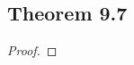 \documentclass[../../main.tex]{subfiles}
\begin{document}
\subsection{Theorem 9.7}
\begin{wts}

\end{wts}
\begin{proof}

\end{proof}
\end{document}
